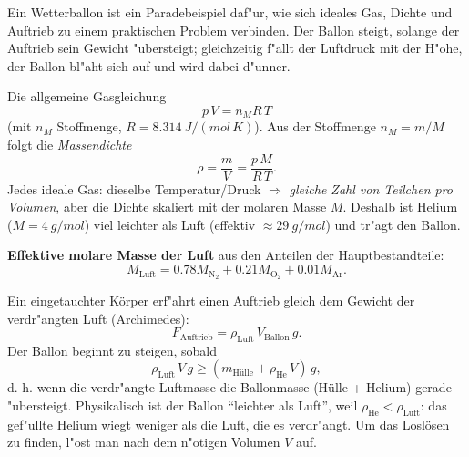 

Ein Wetterballon ist ein Paradebeispiel daf"ur, wie sich ideales Gas,
Dichte und Auftrieb zu einem praktischen Problem verbinden. Der Ballon
steigt, solange der Auftrieb sein Gewicht "ubersteigt; gleichzeitig f"allt
der Luftdruck mit der H"ohe, der Ballon bl"aht sich auf und wird dabei
d"unner.

\begin{werkzeugkasten}
Die allgemeine Gasgleichung
\begin{equation}
  p\,V=n_M R\,T
\end{equation}
(mit $n_M$ Stoffmenge, $R=\qty{8.314}{J/(mol\,K)}$). Aus der Stoffmenge
$n_M=m/M$ folgt die \emph{Massendichte}
\begin{equation}
  \rho=\frac{m}{V}=\frac{p\,M}{R\,T}.
\end{equation}
Jedes ideale Gas: dieselbe Temperatur/Druck $\Rightarrow$ \emph{gleiche
Zahl von Teilchen pro Volumen}, aber die Dichte skaliert mit der molaren
Masse $M$. Deshalb ist Helium ($M=\qty{4}{g/mol}$) viel leichter als Luft
(effektiv $\approx\qty{29}{g/mol}$) und tr"agt den Ballon.

\textbf{Effektive molare Masse der Luft} aus den Anteilen der
Hauptbestandteile:
\begin{equation}
  M_{\mathrm{Luft}}=0.78M_{\mathrm{N}_2}+0.21M_{\mathrm{O}_2}
  +0.01M_{\mathrm{Ar}}.
\end{equation}
\end{werkzeugkasten}

\begin{werkzeugkasten}
Ein eingetauchter Körper erf"ahrt einen Auftrieb gleich dem Gewicht der
verdr"angten Luft (Archimedes):
\begin{equation}
  F_{\text{Auftrieb}}=\rho_{\mathrm{Luft}}\,V_{\mathrm{Ballon}}\,g.
\end{equation}
Der Ballon beginnt zu steigen, sobald
\begin{equation}
  \rho_{\mathrm{Luft}}\,V\,g \ge (m_{\mathrm{Hülle}}+\rho_{\mathrm{He}}\,V)\,g,
\end{equation}
d. h. wenn die verdr"angte Luftmasse die Ballonmasse (Hülle + Helium)
gerade "ubersteigt. Physikalisch ist der Ballon ``leichter als Luft'',
weil $\rho_{\mathrm{He}}<\rho_{\mathrm{Luft}}$: das gef"ullte Helium wiegt
weniger als die Luft, die es verdr"angt. Um das Loslösen zu finden, l"ost
man nach dem n"otigen Volumen $V$ auf.
\end{werkzeugkasten}

